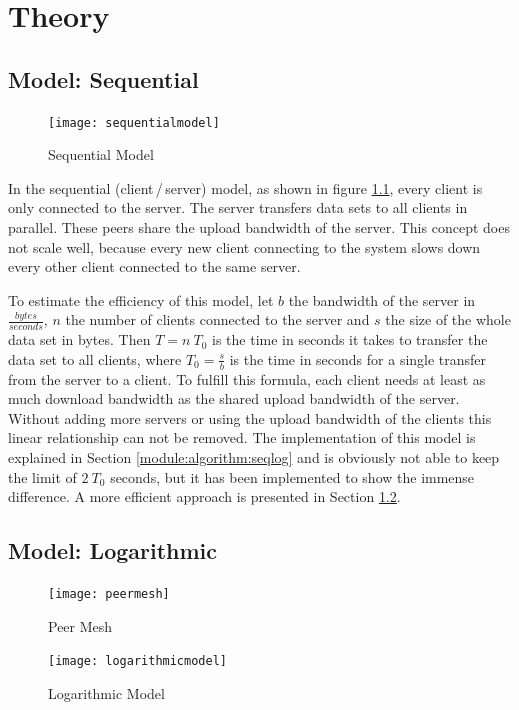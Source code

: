 
\chapter{Theory}
\label{theory}

\section{Model: Sequential}
\label{theory:model:sequential}

\begin{figure}[ht]
	\centering
	\texttt{[image: sequentialmodel]}
	\caption{Sequential Model}
	\label{fig:sequentialmodel}
\end{figure}

In the sequential (client\,/\,server) model, as shown in figure \ref{fig:sequentialmodel}, every client is only connected to the server. The server transfers data sets to all clients in parallel. These peers share the upload bandwidth of the server. This concept does not scale well, because every new client connecting to the system slows down every other client connected to the same server. 

To estimate the efficiency of this model, let $b$ the bandwidth of the server in $\frac{bytes}{seconds}$, $n$ the number of clients connected to the server and $s$ the size of the whole data set in bytes. Then $T= n\:T_0$ is the time in seconds it takes to transfer the data set to all clients, where $T_0=\frac{s}{b}$ is the time in seconds for a single transfer from the server to a client. To fulfill this formula, each client needs at least as much download bandwidth as the shared upload bandwidth of the server. Without adding more servers or using the upload bandwidth of the clients this linear relationship can not be removed. The implementation of this model is explained in Section \ref{module:algorithm:seqlog} and is obviously not able to keep the limit of $2\:T_0$ seconds, but it has been implemented to show the immense difference. A more efficient approach is presented in Section \ref{theory:model:logarithmic}.

\pagebreak
\section{Model: Logarithmic}
\label{theory:model:logarithmic}

\begin{figure} [ht]
	\centering
	\begin{minipage}[b]{0.4\linewidth}
		\texttt{[image: peermesh]}
		\caption{Peer Mesh}
		\label{fig:peermesh}
	\end{minipage}
	\hspace{0.1\linewidth}
	\begin{minipage}[b]{0.4\linewidth}
		\texttt{[image: logarithmicmodel]}
		\caption{Logarithmic Model}
		\label{fig:logarithmicmodel}
	\end{minipage}

\end{figure}


